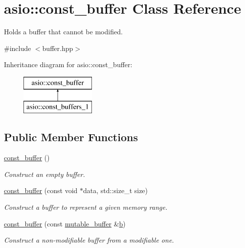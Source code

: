 \hypertarget{classasio_1_1const__buffer}{}\section{asio\+:\+:const\+\_\+buffer Class Reference}
\label{classasio_1_1const__buffer}


Holds a buffer that cannot be modified.  




{\ttfamily \#include $<$buffer.\+hpp$>$}

Inheritance diagram for asio\+:\+:const\+\_\+buffer\+:\begin{figure}[H]
\begin{center}
\leavevmode
\includegraphics[height=2.000000cm]{classasio_1_1const__buffer}
\end{center}
\end{figure}
\subsection*{Public Member Functions}
\begin{DoxyCompactItemize}
\item 
\hyperlink{classasio_1_1const__buffer_a6b8641ed8d12228678c4a18e40656996}{const\+\_\+buffer} ()
\begin{DoxyCompactList}\small\item\em Construct an empty buffer. \end{DoxyCompactList}\item 
\hyperlink{classasio_1_1const__buffer_a155769ebff7a9f7774c8e46b8b744fb5}{const\+\_\+buffer} (const void $\ast$data, std\+::size\+\_\+t size)
\begin{DoxyCompactList}\small\item\em Construct a buffer to represent a given memory range. \end{DoxyCompactList}\item 
\hyperlink{classasio_1_1const__buffer_afa7ee6de40034bad0dd182cfd81437cc}{const\+\_\+buffer} (const \hyperlink{classasio_1_1mutable__buffer}{mutable\+\_\+buffer} \&\hyperlink{group__async__read_ga945a5c18fa77a9e2eba420f8f44b2a4f}{b})
\begin{DoxyCompactList}\small\item\em Construct a non-\/modifiable buffer from a modifiable one. \end{DoxyCompactList}\end{DoxyCompactItemize}
